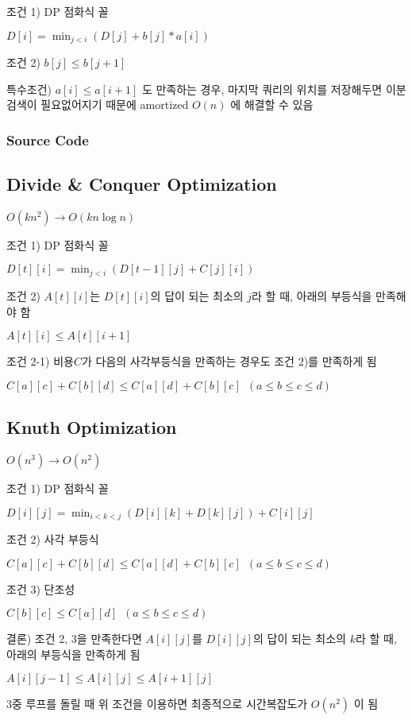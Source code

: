 \documentclass[10pt,landscape,a4paper,twocolumn]{article}
\begin{document}
조건 1) DP 점화식 꼴

$D[i] = \min_{j<i}( D[j] + b[j] * a[i] )$

조건 2) $b[j] \leq b[j+1]$

특수조건) $a[i] \leq a[i+1]$ 도 만족하는 경우, 마지막 쿼리의 위치를 저장해두면 이분검색이 필요없어지기 때문에 amortized $O(n)$ 에 해결할 수 있음
\subsubsection{Source Code}


\subsection{Divide \& Conquer Optimization}

$O(kn^{2}) \to O(kn\log{n})$

조건 1) DP 점화식 꼴

$D[t][i] = \min_{j<i}( D[t-1][j] + C[j][i] )$

조건 2) $A[t][i]$는 $D[t][i]$의 답이 되는 최소의 $j$라 할 때, 아래의 부등식을 만족해야 함

$A[t][i] \leq A[t][i+1]$

조건 2-1) 비용$C$가 다음의 사각부등식을 만족하는 경우도 조건 2)를 만족하게 됨

$C[a][c] + C[b][d] \leq C[a][d] + C[b][c] \phantom{1} (a \leq b \leq c \leq d)$

\subsection{Knuth Optimization}

$O(n^{3}) \to O(n^{2})$

조건 1) DP 점화식 꼴

$D[i][j] = \min_{i<k<j}( D[i][k] + D[k][j] ) + C[i][j]$

조건 2) 사각 부등식

$C[a][c] + C[b][d] \leq C[a][d] + C[b][c] \phantom{1} (a \leq b \leq c \leq d)$

조건 3) 단조성

$C[b][c] \leq C[a][d] \phantom{1} (a \leq b \leq c \leq d)$

결론) 조건 2, 3을 만족한다면  $A[i][j]$를 $D[i][j]$의 답이 되는 최소의 $k$라 할 때, 아래의 부등식을 만족하게 됨

$A[i][j-1] \leq A[i][j] \leq A[i+1][j]$

3중 루프를 돌릴 때 위 조건을 이용하면 최종적으로 시간복잡도가 $O(n^{2})$ 이 됨
\end{document}
